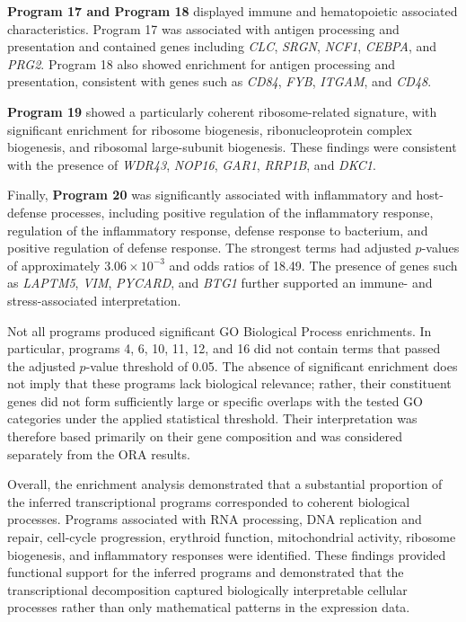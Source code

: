 \documentclass[11pt,a4paper]{article}
\begin{document}
\textbf{Program 17 and Program 18} displayed immune and hematopoietic associated characteristics. Program 17 was associated with antigen processing and presentation and contained genes including \textit{CLC}, \textit{SRGN}, \textit{NCF1}, \textit{CEBPA}, and \textit{PRG2}. Program 18 also showed enrichment for antigen processing and presentation, consistent with genes such as \textit{CD84}, \textit{FYB}, \textit{ITGAM}, and \textit{CD48}. 

\textbf{Program 19} showed a particularly coherent ribosome-related signature, with significant enrichment for ribosome biogenesis, ribonucleoprotein complex biogenesis, and ribosomal large-subunit biogenesis. These findings were consistent with the presence of \textit{WDR43}, \textit{NOP16}, \textit{GAR1}, \textit{RRP1B}, and \textit{DKC1}.

Finally, \textbf{Program 20} was significantly associated with inflammatory and host-defense processes, including positive regulation of the inflammatory response, regulation of the inflammatory response, defense response to bacterium, and positive regulation of defense response. The strongest terms had adjusted $p$-values of approximately $3.06\times10^{-3}$ and odds ratios of 18.49. The presence of genes such as \textit{LAPTM5}, \textit{VIM}, \textit{PYCARD}, and \textit{BTG1} further supported an immune- and stress-associated interpretation.

Not all programs produced significant GO Biological Process enrichments. In particular, programs 4, 6, 10, 11, 12, and 16 did not contain terms that passed the adjusted $p$-value threshold of 0.05. The absence of significant enrichment does not imply that these programs lack biological relevance; rather, their constituent genes did not form sufficiently large or specific overlaps with the tested GO categories under the applied statistical threshold. Their interpretation was therefore based primarily on their gene composition and was considered separately from the ORA results.

Overall, the enrichment analysis demonstrated that a substantial proportion of the inferred transcriptional programs corresponded to coherent biological processes. Programs associated with RNA processing, DNA replication and repair, cell-cycle progression, erythroid function, mitochondrial activity, ribosome biogenesis, and inflammatory responses were identified. These findings provided functional support for the inferred programs and demonstrated that the transcriptional decomposition captured biologically interpretable cellular processes rather than only mathematical patterns in the expression data.
\end{document}
